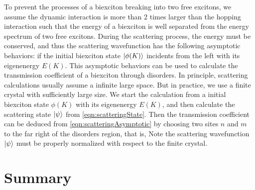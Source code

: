 To prevent the processes of a biexciton breaking into two free excitons, we assume the dynamic interaction is more
than 2 times larger than the hopping interaction such that the energy of a biexciton is well separated from the 
energy spectrum of two free excitons. 
During the scattering process, the energy must be conserved, and thus the
scattering wavefunction has the following asymptotic behaviors:
if the initial biexciton state $| \phi(K) \rangle$ incidents from the left with its eigenenergy $E(K)$. 
This asymptotic behaviors can be used to calculate the transmission coefficient of a biexciton through disorders. 
In principle, scattering calculations usually assume a infinite large space. But in practice, we use a finite crystal  
with sufficiently large size. We start the calculation from a initial biexciton state $\phi(K)$ with
its eigenenergy $E(K)$, and then calculate the scattering state $| \psi \rangle$ from \autoref{eqn:scatteringState}. 
Then the transmission coefficient can be deduced from \autoref{eqn:scatteringAsymptotic} by choosing two sites
$n$ and $m$ to the far right of the disorders region, that is, 
Note the scattering wavefunction $| \psi \rangle$ must be properly normalized with respect to the finite crystal. 

\section{Summary}
\label{sec:summaryGreenFunc}

